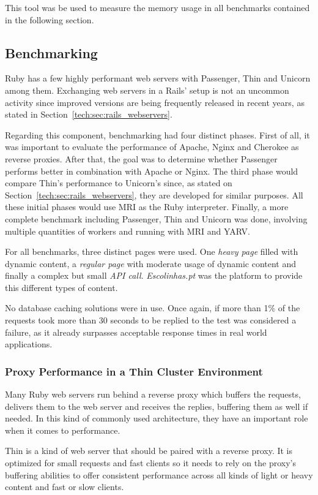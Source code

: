 This tool was be used to measure the memory usage in all benchmarks contained in the following section.

\subsection{Benchmarking}
Ruby has a few highly performant web servers with Passenger, Thin and Unicorn among them. Exchanging web servers in a Rails' setup is not an uncommon activity since improved versions are being frequently released in recent years, as stated in Section~\ref{tech:sec:rails_webservers}.

Regarding this component, benchmarking had four distinct phases. First of all, it was important to evaluate the performance of Apache, Nginx and Cherokee as reverse proxies. After that, the goal was to determine whether Passenger performs better in combination with Apache or Nginx. The third phase would compare Thin's performance to Unicorn's since, as stated on Section~\ref{tech:sec:rails_webservers}, they are developed for similar purposes. All these initial phases would use MRI as the Ruby interpreter. Finally, a more complete benchmark including Passenger, Thin and Unicorn was done, involving multiple quantities of workers and running with MRI and YARV.

For all benchmarks, three distinct pages were used. One \textit{heavy page} filled with dynamic content, a \textit{regular page} with moderate usage of dynamic content and finally a complex but small \textit{API call}. \textit{Escolinhas.pt} was the platform to provide this different types of content.

No database caching solutions were in use. Once again, if more than 1\% of the requests took more than 30 seconds to be replied to the test was considered a failure, as it already surpasses acceptable response times in real world applications. %

\subsubsection{Proxy Performance in a Thin Cluster Environment}
Many Ruby web servers run behind a reverse proxy which buffers the requests, delivers them to the web server and receives the replies, buffering them as well if needed. In this kind of commonly used architecture, they have an important role when it comes to performance.

Thin is a kind of web server that should be paired with a reverse proxy. It is optimized for small requests and fast clients so it needs to rely on the proxy's buffering abilities to offer consistent performance across all kinds of light or heavy content and fast or slow clients.

